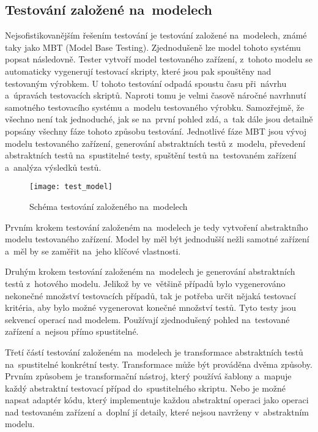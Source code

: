 \subsection{Testování založené na~modelech}
Nejsofistikovanějším řešením testování je testování založené na~modelech, známé taky jako MBT (Model Base Testing). Zjednodušeně lze model tohoto systému popsat následovně. Tester vytvoří model testovaného zařízení, z~tohoto modelu se automaticky vygenerují testovací skripty, které jsou pak spouštěny nad testovaným výrobkem. U tohoto testování odpadá spoustu času při~návrhu a~úpravách testovacích skriptů. Naproti tomu je velmi časově náročné navrhnutí samotného testovacího systému a~modelu testovaného výrobku. Samozřejmě, že všechno není tak jednoduché, jak se na~první pohled zdá, a~tak dále jsou detailně popsány všechny fáze tohoto způsobu testování. Jednotlivé fáze MBT jsou vývoj modelu testovaného zařízení, generování abstraktních testů z~modelu, převedení abstraktních testů na~spustitelné testy, spuštění testů na~testovaném zařízení a~analýza výsledků testů.

\begin{figure}[h]
  \centering
  \texttt{[image: test\_model]}
  \caption{Schéma testování založeného na~modelech \cite{MBT}}
  \label{fig:test_model}
\end{figure}

Prvním krokem testování založeném na~modelech je tedy vytvoření abstraktního modelu testovaného zařízení. Model by měl být jednodušší nežli samotné zařízení a~měl by se zaměřit na~jeho klíčové vlastnosti.

Druhým krokem testování založeném na~modelech je generování abstraktních testů z~hotového modelu. Jelikož by ve~většině případů bylo vygenerováno nekonečné množství testovacích případů, tak je potřeba určit nějaká testovací kritéria, aby bylo možné vygenerovat konečné množství testů. Tyto testy jsou sekvencí operací nad modelem. Používají zjednodušený pohled na~testované zařízení a~nejsou přímo spustitelné.

Třetí částí testování založeném na~modelech je transformace abstraktních testů na~spustitelné konkrétní testy. Transformace může být prováděna dvěma způsoby. Prvním způsobem je transformační nástroj, který používá šablony a~mapuje každý abstraktní testovací případ do~spustitelného skriptu. Nebo je možné napsat adaptér kódu, který implementuje každou abstraktní operaci jako operaci nad testovaném zařízení a~doplní jí detaily, které nejsou navrženy v~abstraktním modelu.

